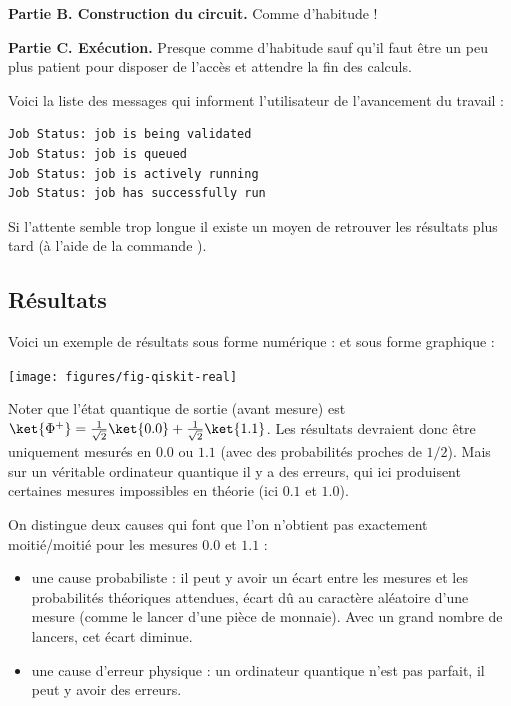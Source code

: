 \documentclass[11pt,class=report,crop=false]{standalone}
\begin{document}
\textbf{Partie B. Construction du circuit.} Comme d'habitude !

\textbf{Partie C. Exécution.} Presque comme d'habitude sauf qu'il faut être un peu plus patient pour disposer de l'accès et attendre la fin des calculs.

Voici la liste des messages qui informent l'utilisateur de l'avancement du travail :
\begin{lstlisting}
Job Status: job is being validated
Job Status: job is queued
Job Status: job is actively running
Job Status: job has successfully run
\end{lstlisting}

Si l'attente semble trop longue il existe un moyen de retrouver les résultats plus tard (à l'aide de la commande ).

\subsection{Résultats}

Voici un exemple de résultats sous forme numérique :
et sous forme graphique :
\begin{center}
\texttt{[image: figures/fig-qiskit-real]}
\end{center}

Noter que l'état quantique de sortie (avant mesure) est
$\ket{\Phi^+} =  \frac1{\sqrt2} \ket{0.0} + \frac1{\sqrt2} \ket{1.1}$.
Les résultats devraient donc être uniquement mesurés en $0.0$ ou $1.1$ (avec des probabilités proches de $1/2$). Mais sur un véritable ordinateur quantique il y a des erreurs, qui ici produisent certaines mesures impossibles en théorie (ici $0.1$ et $1.0$).

On distingue deux causes qui font que l'on n'obtient pas exactement moitié/moitié pour les mesures $0.0$ et $1.1$ :
\begin{itemize}
  \item une cause probabiliste : il peut y avoir un écart entre les mesures et les probabilités théoriques attendues, écart dû au caractère aléatoire d'une mesure (comme le lancer d'une pièce de monnaie). Avec un grand nombre de lancers, cet écart diminue.
  \item une cause d'erreur physique : un ordinateur quantique n'est pas parfait, il peut y avoir des erreurs.
\end{itemize} 
\end{document}
